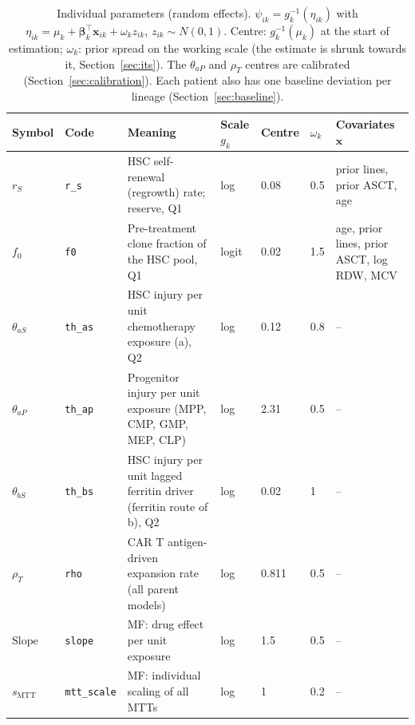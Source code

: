 \begin{table}[!htbp]
\centering
\footnotesize
\setlength{\tabcolsep}{3.5pt}
\caption{Individual parameters (random effects). $\psi_{ik}=g_k^{-1}(\eta_{ik})$ with $\eta_{ik}=\mu_k+\boldsymbol\beta_k^\top\mathbf{x}_{ik}+\omega_k z_{ik}$, $z_{ik}\sim N(0,1)$. Centre: $g_k^{-1}(\mu_k)$ at the start of estimation; $\omega_k$: prior spread on the working scale (the estimate is shrunk towards it, Section~\ref{sec:its}). The $\theta_{aP}$ and $\rho_T$ centres are calibrated (Section~\ref{sec:calibration}). Each patient also has one baseline deviation per lineage (Section~\ref{sec:baseline}).}
\label{tab:re}
\begin{tabular}{ll>{\raggedright\arraybackslash}p{5.4cm}lll>{\raggedright\arraybackslash}p{3.2cm}}
\toprule
Symbol & Code & Meaning & Scale $g_k$ & Centre & $\omega_k$ & Covariates $\mathbf{x}$ \\
\midrule
$r_S$ & \texttt{r\_s} & HSC self-renewal (regrowth) rate; reserve, Q1 & log & 0.08 & 0.5 & prior lines, prior ASCT, age \\
$f_0$ & \texttt{f0} & Pre-treatment clone fraction of the HSC pool, Q1 & logit & 0.02 & 1.5 & age, prior lines, prior ASCT, log RDW, MCV \\
$\theta_{aS}$ & \texttt{th\_as} & HSC injury per unit chemotherapy exposure (a), Q2 & log & 0.12 & 0.8 & -- \\
$\theta_{aP}$ & \texttt{th\_ap} & Progenitor injury per unit exposure (MPP, CMP, GMP, MEP, CLP) & log & 2.31 & 0.5 & -- \\
$\theta_{bS}$ & \texttt{th\_bs} & HSC injury per unit lagged ferritin driver (ferritin route of b), Q2 & log & 0.02 & 1 & -- \\
$\rho_T$ & \texttt{rho} & CAR T antigen-driven expansion rate (all parent models) & log & 0.811 & 0.5 & -- \\
$\mathrm{Slope}$ & \texttt{slope} & MF: drug effect per unit exposure & log & 1.5 & 0.5 & -- \\
$s_{\mathrm{MTT}}$ & \texttt{mtt\_scale} & MF: individual scaling of all MTTs & log & 1 & 0.2 & -- \\
\bottomrule
\end{tabular}
\end{table}
